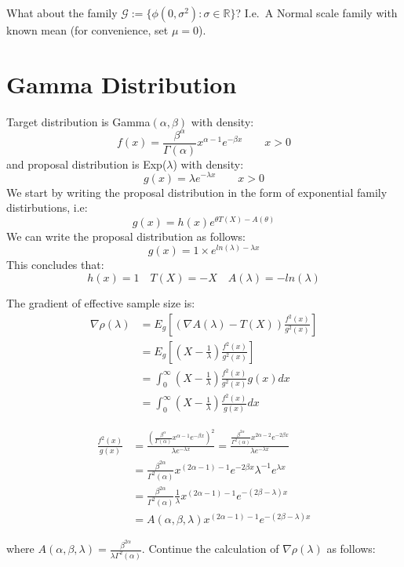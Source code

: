 \documentclass{article}
\begin{document}
What about the family $\mathcal{G} := \{ \phi(0, \sigma^2) : \sigma \in \mathbb{R} \}$? I.e.\ A Normal scale family with known mean (for convenience, set $\mu = 0$).


\section{Gamma Distribution}
Target distribution is Gamma$(\alpha,\beta)$ with density:
$$f(x) = \frac{\beta^\alpha}{\Gamma(\alpha)} x^{\alpha-1} e^{-\beta x} \quad \quad x>0$$
and proposal distribution is Exp($\lambda$) with density:
$$g(x)=\lambda e^{-\lambda x} \quad \quad x>0$$
We start by writing the proposal distribution in the form of exponential family distirbutions, i.e: 
$$g(x) = h(x) e^{\theta T(X) - A(\theta)}$$
We can write the proposal distribution as follows:
$$g(x)=1 \times e^{ln(\lambda)-\lambda x}$$
This concludes that:
$$h(x)=1 \quad T(X) = -X \quad A(\lambda)=-ln(\lambda)$$

The gradient of effective sample size is:
\begin{align*}
\nabla \rho(\lambda) &= E_{g} \left[ (\nabla A(\lambda) - T(X) ) \frac{f^{2}(x)}{g^{2}(x)} \right] \\
&= E_{g} \left[ (X - \frac{1}{\lambda})  \frac{f^{2}(x)}{g^{2}(x)} \right] \\
&= \int_{0}^{\infty} (X - \frac{1}{\lambda}) \frac{f^{2}(x)}{g^{2}(x)} g(x) dx \\
&= \int_{0}^{\infty} (X - \frac{1}{\lambda}) \frac{f^{2}(x)}{g(x)} dx 
\end{align*}


\begin{align*}
\frac{f^{2}(x)}{g(x)} &= \frac{ \left( \frac{\beta^\alpha}{\Gamma(\alpha)} x^{\alpha - 1} e^{-\beta x} \right)^2 }{\lambda e^{-\lambda x}} = \frac{ \frac{ \beta^{2 \alpha} }{ \Gamma^{2}(\alpha) }x^{2\alpha-2} e^{-2 \beta x} }{\lambda e^{-\lambda x}} \\
&= \frac{\beta^{2 \alpha}}{\Gamma^{2}(\alpha)} x^{(2 \alpha - 1)-1} e^{-2 \beta x} \lambda^{-1} e^{\lambda x} \\
&= \frac{\beta^{2 \alpha}}{\Gamma^{2}(\alpha)} \frac{1}{\lambda} x^{(2 \alpha - 1)-1} e^{-(2 \beta - \lambda) x} \\
&= A(\alpha,\beta,\lambda) x^{(2 \alpha - 1) - 1} e^{-(2 \beta - \lambda)x}
\end{align*}

where $A(\alpha,\beta,\lambda) = \frac{\beta^{2 \alpha}}{\lambda \Gamma^{2}(\alpha)}$. Continue the calculation of $\nabla \rho(\lambda)$ as follows:
\end{document}
